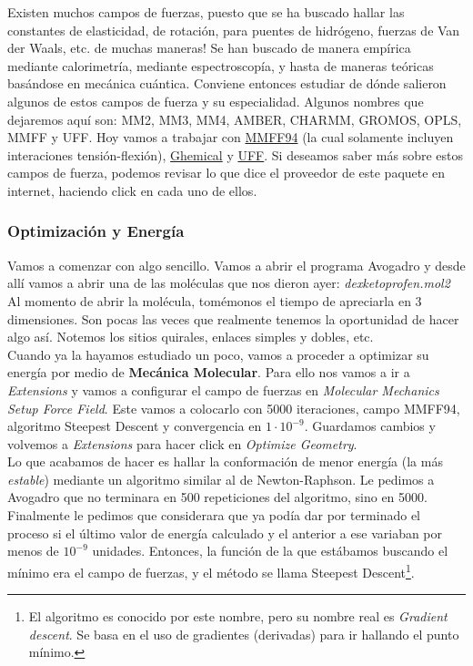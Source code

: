 \documentclass[10pt,letterpaper]{article}
\begin{document}
Existen muchos campos de fuerzas, puesto que se ha buscado hallar las constantes de elasticidad, de rotaci\'on, para puentes de hidr\'ogeno, fuerzas de Van der Waals, etc. de muchas maneras! Se han buscado de manera emp\'irica mediante calorimetr\'ia, mediante espectroscop\'ia, y hasta de maneras te\'oricas bas\'andose en mec\'anica cu\'antica. Conviene entonces estudiar de d\'onde salieron algunos de estos campos de fuerza y su especialidad. Algunos nombres que dejaremos aqu\'i son: MM2, MM3, MM4, AMBER, CHARMM, GROMOS, OPLS, MMFF y UFF. Hoy vamos a trabajar con \href{http://open-babel.readthedocs.org/en/latest/Forcefields/mmff94.html}{MMFF94} (la cual solamente incluyen interaciones tensión-flexión), \href{http://open-babel.readthedocs.org/en/latest/Forcefields/ghemical.html}{Ghemical} y \href{http://open-babel.readthedocs.org/en/latest/Forcefields/uff.html}{UFF}. Si deseamos saber m\'as sobre estos campos de fuerza, podemos revisar lo que dice el proveedor de este paquete en internet, haciendo click en cada uno de ellos.

\subsubsection{Optimizaci\'on y Energ\'ia}
Vamos a comenzar con algo sencillo. Vamos a abrir el programa Avogadro y desde all\'i vamos a abrir una de las mol\'eculas que nos dieron ayer: \textit{dexketoprofen.mol2} Al momento de abrir la mol\'ecula, tom\'emonos el tiempo de apreciarla en 3 dimensiones. Son pocas las veces que realmente tenemos la oportunidad de hacer algo as\'i. Notemos los sitios quirales, enlaces simples y dobles, etc.\\

Cuando ya la hayamos estudiado un poco, vamos a proceder a optimizar su energ\'ia por medio de \textbf{Mec\'anica Molecular}.  Para ello nos vamos a ir a \emph{Extensions} y vamos a configurar el campo de fuerzas en \emph{Molecular Mechanics} \emph{Setup Force Field}. Este vamos a colocarlo con 5000 iteraciones, campo MMFF94, algoritmo Steepest Descent y convergencia en $1 \cdot 10^{-9}$. Guardamos cambios y volvemos a \emph{Extensions} para hacer click en \emph{Optimize Geometry}.\\

Lo que acabamos de hacer es hallar la conformaci\'on de menor energ\'ia (la m\'as \emph{estable}) mediante un algoritmo similar al de Newton-Raphson. Le pedimos a Avogadro que no terminara en 500 repeticiones del algoritmo, sino en 5000. Finalmente le pedimos que considerara que ya pod\'ia dar por terminado el proceso si el \'ultimo valor de energ\'ia calculado y el anterior a ese variaban por menos de $10^{-9}$ unidades. Entonces, la funci\'on de la que est\'abamos buscando el m\'inimo era el campo de fuerzas, y el m\'etodo se llama Steepest Descent\footnote{El algoritmo es conocido por este nombre, pero su nombre real es \emph{Gradient descent}. Se basa en el uso de gradientes (derivadas) para ir hallando el punto m\'inimo.}.\\
\end{document}
